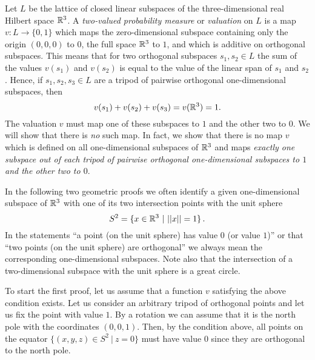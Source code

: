 Let $L$ be the lattice of closed linear subspaces of the
three-dimensional real Hilbert space ${\Bbb R}^3$. A {\em two-valued
probability measure} or {\em valuation} on $L$ is a map
$v:L\to\{0,1\}$ which maps the zero-dimensional subspace
containing only the origin $(0,0,0)$ to $0$, the full space
${\Bbb R}^3$ to $1$, and which is additive on orthogonal subspaces.
This means that for two orthogonal subspaces $s_1, s_2 \in L$
the sum of the values $v(s_1)$ and $v(s_2)$ is equal to the
value of the linear span of $s_1$ and $s_2$. Hence,
if $s_1, s_2, s_3 \in L$ are a tripod of pairwise orthogonal
one-dimensional subspaces, then
\[ v(s_1) + v(s_2) + v(s_3) = v({\Bbb R}^3) = 1. \]
The valuation $v$ must map one of these subspaces to $1$ and the other
two to $0$.
We will show that there is {\it no}  such map.
In fact, we show that there is no map $v$ which is defined on all
one-dimensional subspaces of ${\Bbb R}^3$ and maps
{\em   exactly one subspace out of each tripod of pairwise
      orthogonal one-dimensional subspaces to $1$ and the other two to $0$}.

In the following two geometric proofs we often identify
a given one-dimensional subspace of ${\Bbb R}^3$ with one of its two
intersection points with the unit sphere
\[ S^2 = \{x \in {\Bbb R}^3 \ | \ ||x||=1\}\,. \]
In the statements  ``a point (on the unit sphere) has value $0$
(or value $1$)'' or
that ``two points (on the unit sphere) are orthogonal'' we always
mean the corresponding one-dimensional subspaces.
Note also that the intersection of a two-dimensional subspace with
the unit sphere is a great circle.

To start  the first proof,
let us assume that a function $v$ satisfying the above condition
exists.
Let us consider an arbitrary tripod of orthogonal points
and let us fix the point with value $1$. By a rotation we
can assume that it is the north pole with the coordinates
$(0,0,1)$. Then, by the condition above, all points
on the equator $\{(x,y,z) \in S^2\ | \ z=0\}$ must have value $0$
since they are orthogonal to the north pole.

